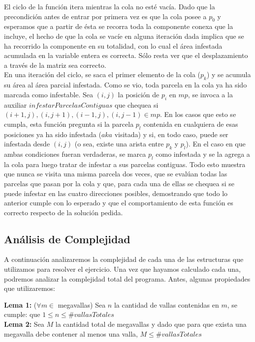 \indent El ciclo de la función itera mientras la cola no esté vacía. Dado que la precondición antes de entrar por primera vez es que la cola posee a $p_{0}$ y esperamos que a partir de ésta se recorra toda la componente conexa que la incluye, el hecho de que la cola se vacíe en alguna iteración dada implica que se ha recorrido la componente en su totalidad, con lo cual el área infestada acumulada en la variable entera es correcta. Sólo resta ver que el desplazamiento a través de la matriz sea correcto.\\
\indent En una iteración del ciclo, se saca el primer elemento de la cola ($p_{k}$) y se acumula su área al área parcial infestada. Como se vio, toda parcela en la cola ya ha sido marcada como infestable. Sea $(i,j)$ la posición de $p_{i}$ en $mp$, se invoca a la auxiliar $infestarParcelasContiguas$ que chequea si $(i+1,j), (i,j+1), (i-1,j),(i,j-1) \in mp$. En los casos que esto se cumpla, esta función pregunta si la parcela $p_{l}$ contenida en cualquiera de esas posiciones ya ha sido infestada ($aka$ visitada) y si, en todo caso, puede ser infestada desde $(i,j)$ (o sea, existe una arista entre $p_{k}$ y $p_{l}$). En el caso en que ambas condiciones fueran verdaderas, se marca $p_{l}$ como infestada y se la agrega a la cola para luego tratar de infestar a sus parcelas contiguas. Todo esto muestra que nunca se visita una misma parcela dos veces, que se evalúan todas las parcelas que pasan por la cola y que, para cada una de ellas se chequea si se puede infestar en las cuatro direcciones posibles, demostrando que todo lo anterior cumple con lo esperado y que el comportamiento de esta función es correcto respecto de la solución pedida. 

\clearpage

\subsection{Análisis de Complejidad}

\indent A continuación analizaremos la complejidad de cada una de las
estructuras que utilizamos para resolver el ejercicio. Una vez que hayamos
calculado cada una, podremos analizar la complejidad total del programa. Antes, algunas propiedades que utilizaremos:

\begin{flushleft}
\textbf{Lema 1:} ($\forall m \in$ megavallas) Sea $n$ la cantidad de vallas contenidas en $m$, se cumple: que $1 \leq n \leq \#vallasTotales$\\

\textbf{Lema 2:} Sea $M$ la cantidad total de megavallas y dado que para que exista una megavalla debe contener al menos una valla, $M \leq \#vallasTotales$\\
\end{flushleft}

